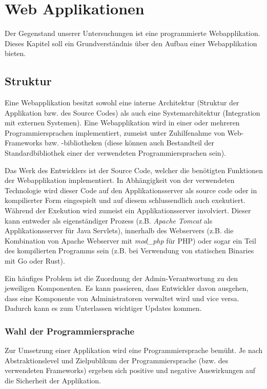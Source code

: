 \chapter{Web Applikationen}

Der Gegenstand unserer Untersuchungen ist eine programmierte Webapplikation. Dieses Kapitel soll ein Grundverständnis über den Aufbau einer Webapplikation bieten.

\section{Struktur}

Eine Webapplikation besitzt sowohl eine interne Architektur (Struktur der Applikation bzw. des Source Codes) als auch eine Systemarchitektur (Integration mit externen Systemen). Eine Webapplikation wird in einer oder mehreren Programmiersprachen implementiert, zumeist unter Zuhilfenahme von Web-Frameworks bzw. -bibliotheken (diese können auch Bestandteil der Standardbibliothek einer der verwendeten Programmiersprachen sein).

Das Werk des Entwicklers ist der Source Code, welcher die benötigten Funktionen der Webapplikation implementiert. In Abhängigkeit von der verwendeten Technologie wird dieser Code auf den Applikationsserver als source code oder in kompilierter Form eingespielt und auf diesem schlussendlich auch exekutiert. Während der Exekution wird zumeist ein Applikationsserver involviert. Dieser kann entweder als eigenständiger Prozess (z.B. \textit{Apache Tomcat} als Applikationsserver für Java Servlets), innerhalb des Webservers (z.B. die Kombination von Apache Webserver mit \textit{mod\_php} für PHP) oder sogar ein Teil des kompilierten Programms sein (z.B. bei Verwendung von statischen Binaries mit Go oder Rust).

Ein häufiges Problem ist die Zuordnung der Admin-Verantwortung zu den jeweiligen Komponenten. Es kann passieren, dass Entwickler davon ausgehen, dass eine Komponente von Administratoren verwaltet wird und vice versa. Dadurch kann es zum Unterlassen wichtiger Updates kommen.

\subsection{Wahl der Programmiersprache}

Zur Umsetzung einer Applikation wird eine Programmiersprache bemüht. Je nach Abstraktionslevel und Zielpublikum der Programmiersprache (bzw. des verwendeten Frameworks) ergeben sich positive und negative Auswirkungen auf die Sicherheit der Applikation.

